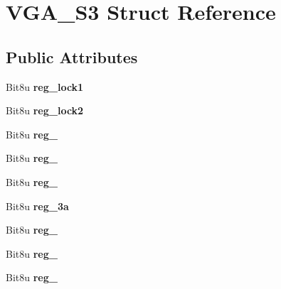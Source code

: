 \hypertarget{structVGA__S3}{\section{V\-G\-A\-\_\-\-S3 Struct Reference}
\label{structVGA__S3}
}
\subsection*{Public Attributes}
\begin{DoxyCompactItemize}
\item 
\hypertarget{structVGA__S3_a17f9a5b1fda5c5ef1b8dc1b0ebbd5f51}{Bit8u {\bfseries reg\-\_\-lock1}}\label{structVGA__S3_a17f9a5b1fda5c5ef1b8dc1b0ebbd5f51}

\item 
\hypertarget{structVGA__S3_a22683bbf0dba9b7817d00d14a34ffd92}{Bit8u {\bfseries reg\-\_\-lock2}}\label{structVGA__S3_a22683bbf0dba9b7817d00d14a34ffd92}

\item 
\hypertarget{structVGA__S3_aa16e17d244fa94fdad87edb17f62c929}{Bit8u {\bfseries reg\-\_}}\label{structVGA__S3_aa16e17d244fa94fdad87edb17f62c929}

\item 
\hypertarget{structVGA__S3_a5bee8377d9775286972b2ddfc91a034d}{Bit8u {\bfseries reg\-\_}}\label{structVGA__S3_a5bee8377d9775286972b2ddfc91a034d}

\item 
\hypertarget{structVGA__S3_aac98187990508ee0aba08f5229eef67d}{Bit8u {\bfseries reg\-\_}}\label{structVGA__S3_aac98187990508ee0aba08f5229eef67d}

\item 
\hypertarget{structVGA__S3_a03a73b32588aa45a25de06e403f0cc0b}{Bit8u {\bfseries reg\-\_\-3a}}\label{structVGA__S3_a03a73b32588aa45a25de06e403f0cc0b}

\item 
\hypertarget{structVGA__S3_ab5b147aa380677058ecb72176a8b8c68}{Bit8u {\bfseries reg\-\_}}\label{structVGA__S3_ab5b147aa380677058ecb72176a8b8c68}

\item 
\hypertarget{structVGA__S3_a36780fcb9f4ae99a9b0ab23192e8cbcd}{Bit8u {\bfseries reg\-\_}}\label{structVGA__S3_a36780fcb9f4ae99a9b0ab23192e8cbcd}

\item 
\hypertarget{structVGA__S3_a1086dc8f32c841868c766327f136b95a}{Bit8u {\bfseries reg\-\_}}\label{structVGA__S3_a1086dc8f32c841868c766327f136b95a}


\end{DoxyCompactItemize}
